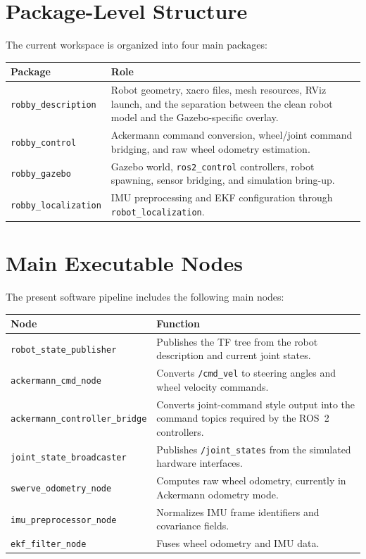 \documentclass[12pt,a4paper]{report}
\begin{document}
\section{Package-Level Structure}
The current workspace is organized into four main packages:
\begin{longtable}{>{\raggedright\arraybackslash}p{} >{\raggedright\arraybackslash}p{}}
\toprule
\textbf{Package} & \textbf{Role} \\
\midrule
\endhead
\texttt{robby\_description} & Robot geometry, xacro files, mesh resources, RViz launch, and the separation between the clean robot model and the Gazebo-specific overlay. \\
\texttt{robby\_control} & Ackermann command conversion, wheel/joint command bridging, and raw wheel odometry estimation. \\
\texttt{robby\_gazebo} & Gazebo world, \texttt{ros2\_control} controllers, robot spawning, sensor bridging, and simulation bring-up. \\
\texttt{robby\_localization} & IMU preprocessing and EKF configuration through \texttt{robot\_localization}. \\
\bottomrule
\end{longtable}

\section{Main Executable Nodes}
The present software pipeline includes the following main nodes:
\begin{longtable}{>{\raggedright\arraybackslash}p{} >{\raggedright\arraybackslash}p{}}
\toprule
\textbf{Node} & \textbf{Function} \\
\midrule
\endhead
\texttt{robot\_state\_publisher} & Publishes the TF tree from the robot description and current joint states. \\
\texttt{ackermann\_cmd\_node} & Converts \texttt{/cmd\_vel} to steering angles and wheel velocity commands. \\
\texttt{ackermann\_controller\_bridge} & Converts joint-command style output into the command topics required by the ROS~2 controllers. \\
\texttt{joint\_state\_broadcaster} & Publishes \texttt{/joint\_states} from the simulated hardware interfaces. \\
\texttt{swerve\_odometry\_node} & Computes raw wheel odometry, currently in Ackermann odometry mode. \\
\texttt{imu\_preprocessor\_node} & Normalizes IMU frame identifiers and covariance fields. \\
\texttt{ekf\_filter\_node} & Fuses wheel odometry and IMU data. \\
\bottomrule
\end{longtable}
\end{document}
